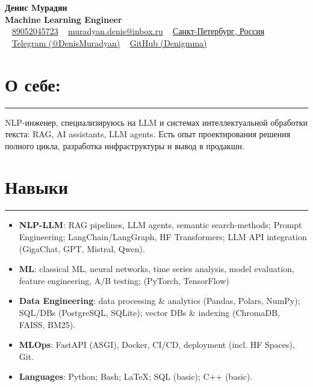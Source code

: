 \documentclass[a4paper,14pt]{article}
\begin{document}
\begin{center}
    {\Huge \bfseries Денис Mурадян} \\
    \vspace{0.5em}
    {\Large \bfseries Machine Learning Engineer} \\
    \vspace{1em}
    \faPhone~ \href{tel:89052045723}{89052045723} \hspace{1em}
    \faEnvelope~ \href{mailto:muradyan.denis@inbox.ru}{muradyan.denis@inbox.ru} \hspace{1em}
    \faHome~ \href{https://yandex.ru/maps/-/CHRjvNpm}{Санкт-Петербург, Россия} \\
    \vspace{0.5em}
    \faTelegram~ \href{https://t.me/DenisMuradyan}{Telegram (@DenisMuradyan)}
    \faGithub~ \href{https://github.com/Denigmma}{GitHub (Denigmma)} \hspace{1em}
\end{center}

\section*{\textbf{О себе:}}
\hrule
NLP-инженер, специализируюсь на LLM и системах интеллектуальной обработки текста: RAG, AI assistants, LLM agents. Есть опыт проектирования решения полного цикла, разработка инфраструктуры и вывод в продакшн.

\section*{Навыки}
\hrule
\vspace{0.5em}
\begin{itemize}
    \item \textbf{NLP-LLM}: RAG pipelines, LLM agents, semantic search-methods; Prompt Engineering; LangChain/LangGraph, HF Transformers; LLM API integration (GigaChat, GPT, Mistral, Qwen).
    \item \textbf{ML}: classical ML, neural networks, time series analysis, model evaluation, feature engineering, A/B testing; (PyTorch, TensorFlow)
    \item \textbf{Data Engineering}: data processing \& analytics (Pandas, Polars, NumPy); SQL/DBs (PostgreSQL, SQLite); vector DBs \& indexing (ChromaDB, FAISS, BM25).
    \item \textbf{MLOps}: FastAPI (ASGI), Docker, CI/CD, deployment (incl. HF Spaces), Git.
    \item \textbf{Languages}: Python; Bash; LaTeX; SQL (basic); C++ (basic).
\end{itemize}
\end{document}
